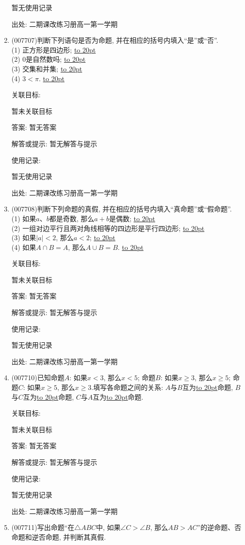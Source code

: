 \documentclass[10pt,a4paper]{article}
\newcommand{\blank}[1]{\underline{\hbox to #1pt{}}}
\begin{document}
\begin{enumerate}[1.]
暂无使用记录


出处: 二期课改练习册高一第一学期
\item { (007707)}判断下列语句是否为命题, 并在相应的括号内填入``是''或``否''.\\
(1) 正方形是四边形; \blank{20}\\
(2) $0$是自然数吗; \blank{20}\\
(3) 交集和并集; \blank{20}\\
(4) $3<\pi$. \blank{20}


关联目标:

暂未关联目标

答案: 暂无答案

解答或提示: 暂无解答与提示

使用记录:

暂无使用记录


出处: 二期课改练习册高一第一学期
\item { (007708)}判断下列命题的真假, 并在相应的括号内填入``真命题''或``假命题''.\\
(1) 如果$a$、$b$都是奇数, 那么$a+b$是偶数; \blank{20}\\
(2) 一组对边平行且两对角线相等的四边形是平行四边形; \blank{20}\\
(3) 如果$|a|<2$, 那么$a<2$; \blank{20}\\
(4) 如果$A\cap B=A$, 那么$A\cup B=B$. \blank{20}


关联目标:

暂未关联目标

答案: 暂无答案

解答或提示: 暂无解答与提示

使用记录:

暂无使用记录


出处: 二期课改练习册高一第一学期
\item { (007710)}已知命题$A$: 如果$x<3$, 那么$x<5$; 命题$B$: 如果$x\ge 3$, 那么$x\ge 5$; 命题$C$: 如果$x\ge 5$, 那么$x\ge 3$.填写各命题之间的关系:
$A$与$B$互为\blank{20}命题, $B$与$C$互为\blank{20}命题, $C$与$A$互为\blank{20}命题.


关联目标:

暂未关联目标

答案: 暂无答案

解答或提示: 暂无解答与提示

使用记录:

暂无使用记录


出处: 二期课改练习册高一第一学期
\item { (007711)}写出命题``在$\triangle ABC$中, 如果$\angle C>\angle B$, 那么$AB>AC$''的逆命题、否命题和逆否命题, 并判断其真假.



\end{enumerate}
\end{document}
